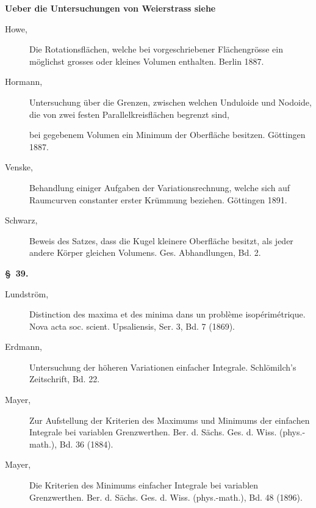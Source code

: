 \documentclass[11pt,a4paper,leqno]{article}
\begin{document}
\begin{center}{\bfseries Ueber die Untersuchungen von Weierstrass siehe}\end{center}

\begin{description}
\item[Howe,] Die Rotationsflächen, welche bei vorgeschriebener Flächengrösse
ein möglichst grosses oder kleines Volumen enthalten. Berlin 1887.

\item[Hormann,] Untersuchung über die Grenzen, zwischen welchen Unduloide und
Nodoide, die von zwei festen Parallelkreisflächen begrenzt sind,

bei gegebenem Volumen ein Minimum der Oberfläche besitzen. Göttingen 1887.

\item[Venske,] Behandlung einiger Aufgaben der Variationsrechnung, welche sich
auf Raumcurven constanter erster Krümmung beziehen. Göttingen 1891.

\item[Schwarz,] Beweis des Satzes, dass die Kugel kleinere Oberfläche besitzt,
als jeder andere Körper gleichen Volumens. Ges. Abhandlungen, Bd. 2.
\end{description}

\begin{center}{\bfseries \S~39.}\end{center}

\begin{description}
\item[Lundström,] Distinction des maxima et des minima dans un problème
isopérimétrique. Nova acta soc. scient. Upsaliensis, Ser. 3, Bd. 7 (1869).

\item[Erdmann,] Untersuchung der höheren Variationen einfacher Integrale.
Schlömilch's Zeitschrift, Bd. 22.

\item[Mayer,] Zur Aufstellung der Kriterien des Maximums und Minimums der
einfachen Integrale bei variablen Grenzwerthen. Ber. d. Sächs. Ges. d. Wiss.
(phys.-math.), Bd. 36 (1884).

\item[Mayer,] Die Kriterien des Minimums einfacher Integrale bei variablen
Grenzwerthen. Ber. d. Sächs. Ges. d. Wiss. (phys.-math.), Bd. 48 (1896).
\end{description}
\end{document}
